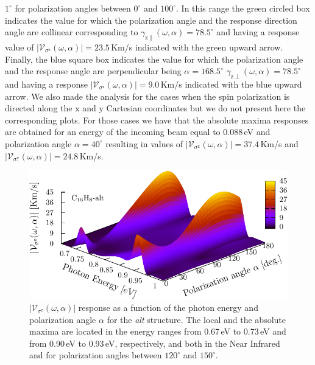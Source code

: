 \documentclass[prb,11pt,tightenlines,twocolumn,aps]{revtex4-1}
\begin{document}
$1^{\circ}$ for polarization angles between $0^{\circ}$ and $100^{\circ}$. In
this range the green circled box indicates the value for which the polarization
angle and the response direction angle are collinear corresponding to
$\gamma_{\mathrm{z}\parallel}(\omega,\alpha) = 78.5^{\circ}$ and having a
response value of $|\mathcal{V}_{\sigma^{\mathrm{z}}}(\omega,\alpha)| =
23.5$\,Km/s indicated with the green upward arrow.
% 
Finally, the blue square box indicates the value for which the polarization
angle and the response angle are perpendicular being $\alpha=168.5^{\circ}$
$\gamma_{\mathrm{z}\perp}(\omega,\alpha) = 78.5^{\circ}$ and having a response
$|\mathcal{V}_{\sigma^{\mathrm{z}}}(\omega,\alpha)|=9.0$\,Km/s indicated with
the blue upward arrow.
% 
We also made the analysis for the cases when the spin polarization is directed
along the $\mathrm{x}$ and $\mathrm{y}$ Cartesian coordinates but we do not
present here the corresponding plots. For those cases we have that the absolute
maxima responses are obtained for an energy of the incoming beam equal to
0.088\,eV and polarization angle $\alpha=40^{\circ}$ resulting in values of
$|\mathcal{V}_{\sigma^{\mathrm{x}}}(\omega,\alpha)|=37.4$\,Km/s and
$|\mathcal{V}_{\sigma^{\mathrm{y}}}(\omega,\alpha)|=24.8$\,Km/s.


\begin{figure}[tb]
    \centering
    \includegraphics[width=\linewidth]{altplots/alt-3d-svaz}
    \caption{$|\mathcal{V}_{\sigma^{\mathrm{z}}}(\omega,\alpha)|$ response
    as a function of the photon energy and polarization angle $\alpha$  for the
    \emph{alt} structure. The local and the absolute maxima are located in the
    energy ranges from 0.67\,eV to 0.73\,eV and from 0.90\,eV to 0.93\,eV,
    respectively, and both in the Near Infrared and for polarization angles
    between $120^{\circ}$ and $150^{\circ}$.}
    \label{fig:alt-3d-vsb}
\end{figure}
\end{document}
